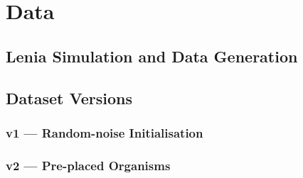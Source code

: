 \section{Data}

\subsection{Lenia Simulation and Data Generation}

\subsection{Dataset Versions}

\subsubsection{v1 — Random-noise Initialisation}

\subsubsection{v2 — Pre-placed Organisms}
